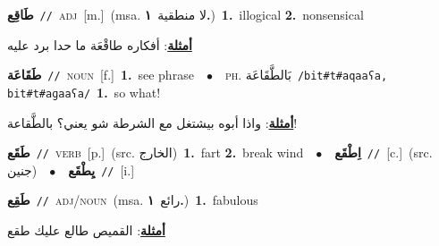 \documentclass[10pt,a4paper,twoside]{article} %
\begin{document}
\begin{multicols}{2}
{\setlength\topsep{0pt}\textbf{\foreignlanguage{arabic}{طَاقِع}}\ {\color{gray}\texttt{//}\color{black}}\ \textsc{adj}\ [m.]\ \color{gray}(msa. \foreignlanguage{arabic}{لا منطقية}~\foreignlanguage{arabic}{\textbf{١.}})\color{black}\ \textbf{1.}~illogical  \textbf{2.}~nonsensical\  \begin{flushright}\color{gray}\foreignlanguage{arabic}{\textbf{\underline{\foreignlanguage{arabic}{أمثلة}}}: أفكاره طاقْعَة ما حدا برد عليه}\end{flushright}\color{black}} \vspace{2mm}

{\setlength\topsep{0pt}\textbf{\foreignlanguage{arabic}{طَقَاعَة}}\ {\color{gray}\texttt{//}\color{black}}\ \textsc{noun}\ [f.]\ \textbf{1.}~see phrase\ \ $\bullet$\ \ \textsc{ph.} \color{gray} \foreignlanguage{arabic}{بَالطَّقَاعَة}\color{black}\ {\color{gray}\texttt{/{\sffamily bit\#t\#aqaaʕa, bit\#t\#aɡaaʕa}/}\color{black}}\ \textbf{1.}~so what!\  \begin{flushright}\color{gray}\foreignlanguage{arabic}{\textbf{\underline{\foreignlanguage{arabic}{أمثلة}}}: واذا أبوه بيشتغل مع الشرطة شو يعني؟ بالطَّقاعة!}\end{flushright}\color{black}} \vspace{2mm}

{\setlength\topsep{0pt}\textbf{\foreignlanguage{arabic}{طَقَع}}\ {\color{gray}\texttt{//}\color{black}}\ \textsc{verb}\ [p.]\ (src. \color{gray}\foreignlanguage{arabic}{الخارج}\color{black})\ \textbf{1.}~fart  \textbf{2.}~break wind\ \ $\bullet$\ \ \setlength\topsep{0pt}\textbf{\foreignlanguage{arabic}{اِطْقَع}}\ {\color{gray}\texttt{//}\color{black}}\ [c.]\ (src. \color{gray}\foreignlanguage{arabic}{جنين}\color{black})\ \ $\bullet$\ \ \setlength\topsep{0pt}\textbf{\foreignlanguage{arabic}{يِطْقَع}}\ {\color{gray}\texttt{//}\color{black}}\ [i.]\ } \vspace{2mm}

{\setlength\topsep{0pt}\textbf{\foreignlanguage{arabic}{طَقِع}}\ {\color{gray}\texttt{//}\color{black}}\ \textsc{adj/noun}\ \color{gray}(msa. \foreignlanguage{arabic}{رائع}~\foreignlanguage{arabic}{\textbf{١.}})\color{black}\ \textbf{1.}~fabulous\  \begin{flushright}\color{gray}\foreignlanguage{arabic}{\textbf{\underline{\foreignlanguage{arabic}{أمثلة}}}: القميص طالع عليك طقع}\end{flushright}\color{black}} \vspace{2mm}


\end{multicols}
\end{document}
